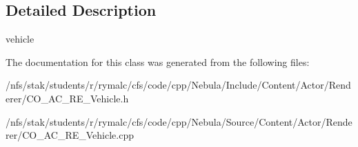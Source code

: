 \subsection{Detailed Description}
vehicle 

The documentation for this class was generated from the following files:\begin{DoxyCompactItemize}
\item 
/nfs/stak/students/r/rymalc/cfs/code/cpp/Nebula/Include/Content/Actor/Renderer/CO\_\-AC\_\-RE\_\-Vehicle.h\item 
/nfs/stak/students/r/rymalc/cfs/code/cpp/Nebula/Source/Content/Actor/Renderer/CO\_\-AC\_\-RE\_\-Vehicle.cpp\end{DoxyCompactItemize}
